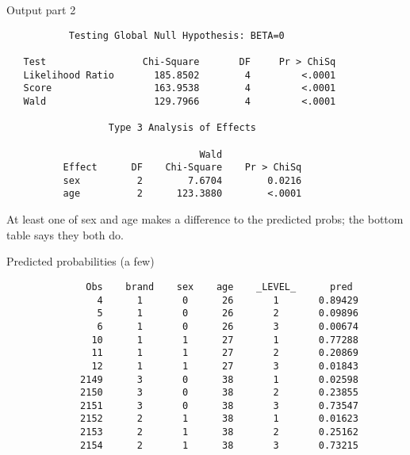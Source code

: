 \documentclass[pdf]{prosper}
\begin{document}
\begin{slide}{Output part 2}

{\scriptsize
\begin{verbatim}
           Testing Global Null Hypothesis: BETA=0

   Test                 Chi-Square       DF     Pr > ChiSq
   Likelihood Ratio       185.8502        4         <.0001
   Score                  163.9538        4         <.0001
   Wald                   129.7966        4         <.0001

                  Type 3 Analysis of Effects

                                  Wald
          Effect      DF    Chi-Square    Pr > ChiSq
          sex          2        7.6704        0.0216
          age          2      123.3880        <.0001
\end{verbatim}
}

At least one of sex and age makes a difference to the predicted probs; the bottom table says they both do.
  
\end{slide}

\begin{slide}{Predicted probabilities (a few)}

{\scriptsize
\begin{verbatim}
              Obs    brand    sex    age    _LEVEL_      pred   
                4      1       0      26       1       0.89429  
                5      1       0      26       2       0.09896  
                6      1       0      26       3       0.00674  
               10      1       1      27       1       0.77288  
               11      1       1      27       2       0.20869  
               12      1       1      27       3       0.01843  
             2149      3       0      38       1       0.02598  
             2150      3       0      38       2       0.23855  
             2151      3       0      38       3       0.73547  
             2152      2       1      38       1       0.01623  
             2153      2       1      38       2       0.25162  
             2154      2       1      38       3       0.73215  
\end{verbatim}
}
  
\end{slide}
\end{document}
